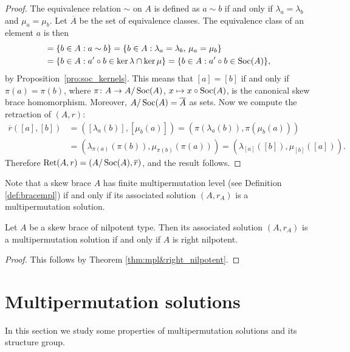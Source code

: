 \begin{proof}
    The equivalence relation $\sim$ on $A$ is defined as $a\sim b$ if and only if $\lambda_a=\lambda_b$ and 
    $\mu_a=\mu_b$. Let $\overline{A}$ be the set of equivalence classes. 
    The equivalence class of an element $a$ is then
    \begin{align*}
    [a]&=\{b\in A:a\sim b\}
    =\{b\in A:\lambda_a=\lambda_b,\,\mu_a=\mu_b\}\\
    &=\{b\in A:a'\circ b\in \ker\lambda\cap\ker\mu\}=\{b\in A:a'\circ b\in\Soc(A)\},
    \end{align*}
    by Proposition~\ref{pro:soc_kernels}. This means that 
    $[a]=[b]$ if and only if $\pi(a)=\pi(b)$, where $\pi\colon A\to A/\operatorname{Soc}(A)$, $x\mapsto x\circ\operatorname{Soc}(A)$,  
    is the canonical skew brace homomorphism. Moreover, $A/\operatorname{Soc}(A)=\overline{A}$ as sets. 
    Now we compute the retraction of $(A,r)$:
    \begin{align*}
        \overline{r}([a],[b]) &= ([\lambda_a(b)],[\mu_b(a)])
        =(\pi(\lambda_a(b)),\pi(\mu_b(a)))\\
        &=\left(\lambda_{\pi(a)}(\pi(b)),\mu_{\pi(b)}(\pi(a))\right)
        =\left(\lambda_{[a]}([b]),\mu_{[b]}([a])\right).
    \end{align*}
    Therefore $\operatorname{Ret}(A,r)=(A/\operatorname{Soc}(A),\overline{r})$, and the result follows. 
\end{proof}

Note that a skew brace $A$ has finite multipermutation level (see Definition \ref{def:bracempl}) if and only if its associated solution $(A,r_A)$ is a multipermutation solution.

\begin{proposition}
\label{pro:bracefinmpl}
Let $A$ be a skew brace of nilpotent type. Then its associated solution $(A,r_A)$ is a multipermutation solution if and only if $A$ is right nilpotent.
\end{proposition}

\begin{proof}
This follows by Theorem \ref{thm:mpl&right_nilpotent}.
\end{proof}

\section{Multipermutation solutions}

In this section we study some properties of multipermutation solutions and its structure group.


